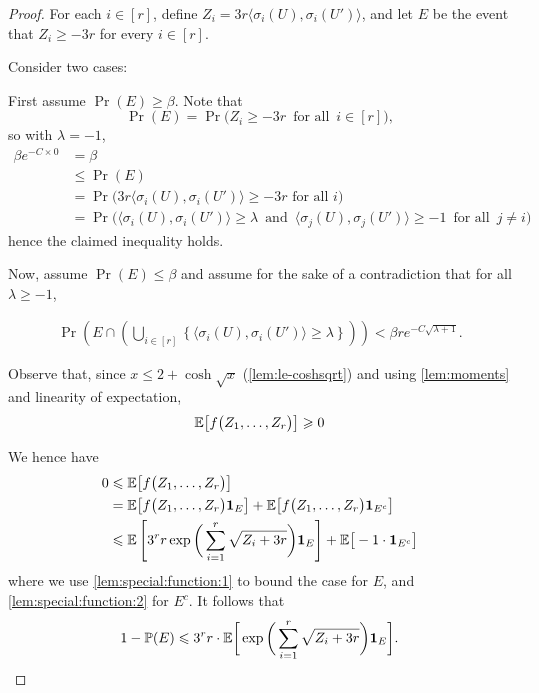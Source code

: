 \begin{proof}
  For each \(i \in [r]\), define \(Z_i = 3r\big\langle \sigma_i(U),\sigma_i(U') \big\rangle\), and let \(E\) be the event that \(Z_i \ge -3r\) for every \(i \in [r]\).

  Consider two cases:

  First assume \(\Pr(E) \ge \beta\). Note that
  \begin{equation*}
    \Pr(E) = \Pr\Big( Z_i \ge - 3r \, \text{ for all } \, i \in [r] \Big),
  \end{equation*}
  so with \(\lambda = -1\),
  \begin{align*}
    \beta e^{-C\times 0} &= \beta\\
    &\le \Pr(E)\\
    &= \Pr\Big(3r\big\langle \sigma_i(U),\sigma_i(U') \big\rangle \ge -3r \text{ for all }i\Big)\\
    &= \Pr\Big( \big\langle \sigma_i(U),\sigma_i(U') \big\rangle \ge \lambda \, \text{ and } \, \big\langle \sigma_j(U), \sigma_j(U') \big\rangle \ge -1 \, \text{ for all } \, j \ne i \Big)
  \end{align*}
  hence the claimed inequality holds.

  Now, assume \(\Pr(E) \le \beta\) and assume for the sake of a contradiction that for all \(\lambda \geq -1\),

  \begin{align}\label{eq:max:big:and:E:no}
    \Pr\left(E \cap \left( \bigcup_{i \in [r]} \left\{ \big\langle \sigma_i(U),\sigma_i(U') \big\rangle \ge \lambda \right\}\right)\right) < \beta r e^{-C\sqrt{\lambda + 1}}.
  \end{align}

  Observe that, since \(x \le 2 + \cosh\sqrt{x}\) (\autoref{lem:le-coshsqrt}) and using \autoref{lem:moments} and linearity of expectation,
  \[
    \mathbb{E}\big[ f\big( Z_1,\ldots,Z_r \big) \big] \geqslant 0
  \]

  We hence have
  \begin{align*}
    0 &\leqslant \mathbb{E}\big[ f\big( Z_1,\ldots,Z_r \big) \big]\\
    &= \mathbb{E}\big[ f\big( Z_1,\ldots,Z_r \big)  \mathbf{1}_E \big] + \mathbb{E}\big[ f\big( Z_1,\ldots,Z_r \big) \mathbf{1}_{E^c} \big]\\
    &\leqslant \mathbb{E}\left[ 3^r r \exp\bigg( \displaystyle\sum_{i = 1}^r \sqrt{ Z_i + 3r } \bigg)  \mathbf{1}_E \right] + \mathbb{E}\big[-1 \cdot \mathbf{1}_{E^c} \big]
  \end{align*}
  where we use \autoref{lem:special:function:1} to bound the case for \(E\), and \autoref{lem:special:function:2} for \(E^c\).
  It follows that
  \begin{equation}\label{eq:eventE:inequality}
    1 - \mathbb{P}(E) \leqslant 3^r r \cdot \mathbb{E}\bigg[ \exp\bigg( \sum_{i = 1}^r \sqrt{ Z_i + 3r } \bigg) \mathbf{1}_E \bigg].
  \end{equation}


\end{proof}
